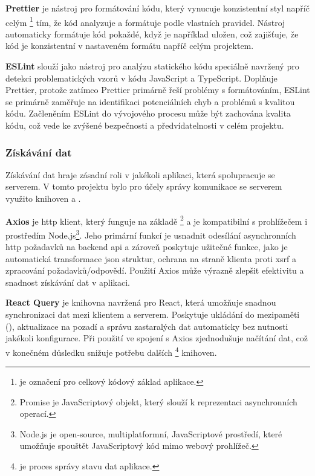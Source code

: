 \textbf{Prettier} je nástroj pro formátování kódu, který vynucuje konzistentní styl napříč celým \footnote{ je označení pro celkový kódový základ aplikace.} tím, že kód analyzuje a formátuje podle vlastních pravidel.
Nástroj automaticky formátuje kód pokaždé, když je například uložen, což zajišťuje, že kód je konzistentní v nastaveném formátu napříč celým projektem\cite{p__prettier_io}.

\textbf{ESLint} slouží jako nástroj pro analýzu statického kódu speciálně navržený pro detekci problematických vzorů v kódu JavaScript a TypeScript.
Doplňuje Prettier, protože zatímco Prettier primárně řeší problémy s formátováním, ESLint se primárně zaměřuje na identifikaci potenciálních chyb a problémů s kvalitou kódu.
Začleněním ESLint do vývojového procesu může být zachována kvalita kódu, což vede ke zvýšené bezpečnosti a předvídatelnosti v celém projektu\cite{e__eslint_org}.

\subsubsection{Získávání dat}
\label{subsubsec:implementace-technologie-ostatni-ziskavani}
Získávání dat hraje zásadní roli v jakékoli aplikaci, která spolupracuje se serverem.
V tomto projektu bylo pro účely správy komunikace se serverem využito knihoven  a .

\textbf{Axios} je \ac{http} klient, který funguje na základě \footnote{Promise je JavaScriptový objekt, který slouží k reprezentaci asynchronních operací.} a je kompatibilní s prohlížečem i prostředím Node.js\footnote{Node.js je open-source, multiplatformní, JavaScriptové prostředí, které umožňuje spouštět JavaScriptový kód mimo webový prohlížeč\cite{n__nodejs_org}.}.
Jeho primární funkcí je usnadnit odesílání asynchronních \ac{http} požadavků na backend \ac{api} a zároveň poskytuje užitečné funkce, jako je automatická transformace \ac{json} struktur, ochrana na straně klienta proti \ac{xsrf} a zpracování požadavků/odpovědí.
Použití Axios může výrazně zlepšit efektivitu a snadnost získávání dat v aplikaci.

\textbf{React Query} je knihovna navržená pro React, která umožňuje snadnou synchronizaci dat mezi klientem a serverem.
Poskytuje ukládání do mezipaměti (), aktualizace na pozadí a správu zastaralých dat automaticky bez nutnosti jakékoli konfigurace.
Při použití ve spojení s Axios zjednodušuje načítání dat, což v konečném důsledku snižuje potřebu dalších \footnote{ je proces správy stavu dat aplikace.} knihoven.

